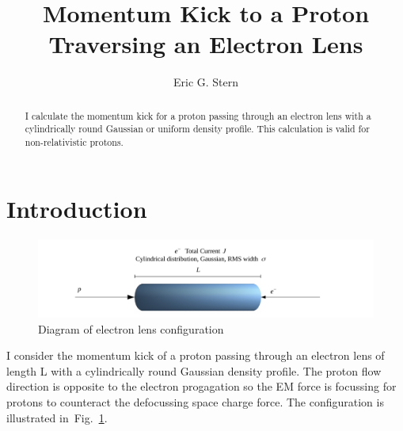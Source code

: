 \documentclass[acus]{jacow}
\begin{document}
\title{Momentum Kick to a Proton Traversing an Electron Lens}

\author{Eric G. Stern}

\maketitle

\begin{abstract}
  I calculate the momentum kick for a proton passing through an electron lens
  with a cylindrically round Gaussian or uniform density profile.
  This calculation is valid for non-relativistic protons.
\end{abstract}

\section{Introduction}

\begin{figure}[!htb]
   \centering
   \includegraphics*[width=\columnwidth]{e_lens_sketch.pdf}
   \caption{Diagram of electron lens configuration }
   \label{e_lens_sketch}
\end{figure}


I consider the momentum kick of a proton passing through an electron lens
of length L with a cylindrically round Gaussian density profile.
The proton flow direction is opposite to the electron progagation so the
EM force is focussing for protons to counteract the defocussing space charge
force.
The configuration is illustrated in~Fig.~\ref{e_lens_sketch}.
\end{document}
